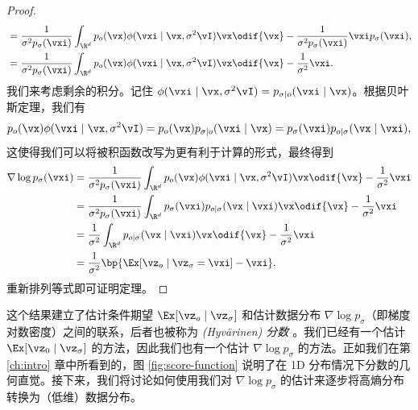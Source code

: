 \documentclass[../../book-main.tex]{subfiles}
\begin{document}
\begin{proof}
\begin{align}
        &= \frac{1}{\sigma^{2}p_{\sigma}(\vxi)}\int_{\R^{d}}p_{o}(\vx)\phi(\vxi \mid \vx, \sigma^{2}\vI)\vx\odif{\vx} - \frac{1}{\sigma^{2}p_{\sigma}(\vxi)}\vxi p_{\sigma}(\vxi), \\
        &= \frac{1}{\sigma^{2}p_{\sigma}(\vxi)}\int_{\R^{d}}p_{o}(\vx)\phi(\vxi \mid \vx, \sigma^{2}\vI)\vx\odif{\vx} - \frac{1}{\sigma^{2}}\vxi.
    \end{align}
    我们来考虑剩余的积分。记住 \(\phi(\vxi \mid \vx, \sigma^{2}\vI) = p_{\sigma \mid o}(\vxi \mid \vx)\)。根据贝叶斯定理，我们有 
    \begin{equation}
        p_{o}(\vx)\phi(\vxi \mid \vx, \sigma^{2}\vI) = p_{o}(\vx)p_{\sigma \mid o}(\vxi \mid \vx) = p_{\sigma}(\vxi)p_{o \mid \sigma}(\vx \mid \vxi), 
    \end{equation}
    这使得我们可以将被积函数改写为更有利于计算的形式，最终得到 
    \begin{align}
        \nabla \log p_{\sigma}(\vxi)
        &= \frac{1}{\sigma^{2}p_{\sigma}(\vxi)}\int_{\R^{d}}p_{o}(\vx)\phi(\vxi \mid \vx, \sigma^{2}\vI)\vx\odif{\vx} - \frac{1}{\sigma^{2}}\vxi \\ 
        &= \frac{1}{\sigma^{2}p_{\sigma}(\vxi)}\int_{\R^{d}}p_{\sigma}(\vxi)p_{o \mid \sigma}(\vx \mid \vxi)\vx\odif{\vx} - \frac{1}{\sigma^{2}}\vxi \\ 
        &= \frac{1}{\sigma^{2}}\int_{\R^{d}}p_{o \mid \sigma}(\vx \mid \vxi)\vx\odif{\vx} - \frac{1}{\sigma^{2}}\vxi \\ 
        &= \frac{1}{\sigma^{2}}\bp{\Ex[\vz_{o} \mid \vz_{\sigma} = \vxi] - \vxi}.
    \end{align}
    重新排列等式即可证明定理。
\end{proof}

这个结果建立了估计条件期望 \(\Ex[\vz_{o} \mid \vz_{\sigma}]\) 和估计数据分布 \(\nabla \log p_{\sigma}\)（即梯度对数密度）之间的联系，后者也被称为 \textit{(Hyv{\"a}rinen) 分数 \cite{hyvarinen05a}}。我们已经有一个估计 \(\Ex[\vz_{0} \mid \vz_{\sigma}]\) 的方法，因此我们也有一个估计 \(\nabla \log p_{\sigma}\) 的方法。正如我们在第 \ref{ch:intro} 章中所看到的，图 \ref{fig:score-function} 说明了在 1D 分布情况下分数的几何直觉。接下来，我们将讨论如何使用我们对 \(\nabla \log p_{\sigma}\) 的估计来逐步将高熵分布转换为（低维）数据分布。
\end{document}
